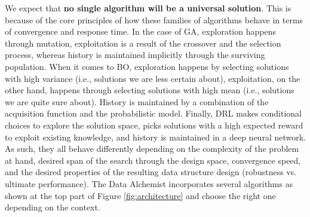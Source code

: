\documentclass[11pt]{article}
\begin{document}
We expect that \textbf{no single algorithm will be a universal solution}. This is because of the core principles of how these families of algorithms behave in terms of convergence and response time. In the case of GA, exploration happens through mutation, exploitation is a result of the crossover and the selection process, whereas history is maintained implicitly through the surviving population. When it comes to BO, exploration happens by selecting solutions with high variance (i.e., solutions we are less certain about), exploitation, on the other hand, happens through selecting solutions with high mean (i.e., solutions we are quite sure about). History is maintained by a combination of the acquisition function and the probabilistic model. Finally, DRL makes conditional choices to explore the solution space, picks solutions with a high expected reward to exploit existing knowledge, and history is maintained in a deep neural network. As such, they all behave differently depending on the complexity of the problem at hand, desired span of the search through the design space, convergence speed, and the desired  properties of the resulting data structure design (robustness vs. ultimate performance). The Data Alchemist  incorporates several algorithms as shown at the top part of Figure \ref{fig:architecture} and choose the right one depending on the context. 
\end{document}
